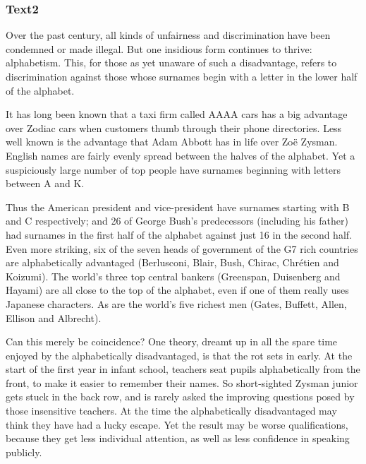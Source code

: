 \documentclass[a4paper]{article}
\begin{document}
\subsubsection{Text2}

\par
Over the past century, all kinds of unfairness and discrimination have been condemned or made illegal. But one insidious form continues to thrive: alphabetism. This, for those as yet unaware of such a disadvantage, refers to discrimination against those whose surnames begin with a letter in the lower half of the alphabet.

\par
It has long been known that a taxi firm called AAAA cars has a big advantage over Zodiac cars when customers thumb through their phone directories. Less well known is the advantage that Adam Abbott has in life over Zoë Zysman. English names are fairly evenly spread between the halves of the alphabet. Yet a suspiciously large number of top people have surnames beginning with letters between A and K.

\par
Thus the American president and vice-president have surnames starting with B and C respectively; and 26 of George Bush’s predecessors (including his father) had surnames in the first half of the alphabet against just 16 in the second half. Even more striking, six of the seven heads of government of the G7 rich countries are alphabetically advantaged (Berlusconi, Blair, Bush, Chirac, Chrétien and Koizumi). The world’s three top central bankers (Greenspan, Duisenberg and Hayami) are all close to the top of the alphabet, even if one of them really uses Japanese characters. As are the world’s five richest men (Gates, Buffett, Allen, Ellison and Albrecht).

\par
Can this merely be coincidence? One theory, dreamt up in all the spare time enjoyed by the alphabetically disadvantaged, is that the rot sets in early. At the start of the first year in infant school, teachers seat pupils alphabetically from the front, to make it easier to remember their names. So short-sighted Zysman junior gets stuck in the back row, and is rarely asked the improving questions posed by those insensitive teachers. At the time the alphabetically disadvantaged may think they have had a lucky escape. Yet the result may be worse qualifications, because they get less individual attention, as well as less confidence in speaking publicly.
\end{document}
